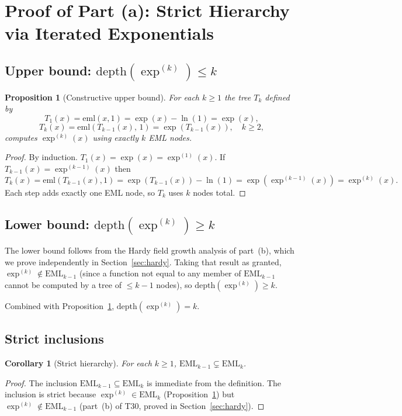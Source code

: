 \documentclass[12pt,a4paper]{article}
\newtheorem{proposition}[theorem]{Proposition}
\newtheorem{corollary}[theorem]{Corollary}
\theoremstyle{definition}
\theoremstyle{remark}
\begin{document}
\section{Proof of Part (a): Strict Hierarchy via Iterated Exponentials}

\subsection{Upper bound: $\mathrm{depth}(\exp^{(k)})\leq k$}

\begin{proposition}[Constructive upper bound]\label{prop:ub}
For each $k\geq 1$ the tree $T_k$ defined by
\[
  T_1(x) = \mathrm{eml}(x,1) = \exp(x)-\ln(1) = \exp(x),
\]
\[
  T_k(x) = \mathrm{eml}(T_{k-1}(x),\,1) = \exp(T_{k-1}(x)),
  \quad k\geq 2,
\]
computes $\exp^{(k)}(x)$ using exactly $k$ EML nodes.
\end{proposition}
\begin{proof}
By induction.  $T_1(x)=\exp(x)=\exp^{(1)}(x)$.  If $T_{k-1}(x)=\exp^{(k-1)}(x)$
then
\[
  T_k(x)=\mathrm{eml}(T_{k-1}(x),1)=\exp(T_{k-1}(x))-\ln(1)
  =\exp(\exp^{(k-1)}(x))=\exp^{(k)}(x).
\]
Each step adds exactly one EML node, so $T_k$ uses $k$ nodes total.
\end{proof}

\subsection{Lower bound: $\mathrm{depth}(\exp^{(k)})\geq k$}

The lower bound follows from the Hardy field growth analysis of part~(b), which
we prove independently in Section~\ref{sec:hardy}.  Taking that result as
granted, $\exp^{(k)}\notin\mathrm{EML}_{k-1}$ (since a function not equal to
any member of $\mathrm{EML}_{k-1}$ cannot be computed by a tree of $\leq k-1$
nodes), so $\mathrm{depth}(\exp^{(k)})\geq k$.

Combined with Proposition~\ref{prop:ub}, $\mathrm{depth}(\exp^{(k)})=k$.

\subsection{Strict inclusions}

\begin{corollary}[Strict hierarchy]\label{cor:strict}
For each $k\geq 1$, $\mathrm{EML}_{k-1}\subsetneq\mathrm{EML}_k$.
\end{corollary}
\begin{proof}
The inclusion $\mathrm{EML}_{k-1}\subseteq\mathrm{EML}_k$ is immediate from the
definition.  The inclusion is strict because $\exp^{(k)}\in\mathrm{EML}_k$
(Proposition~\ref{prop:ub}) but $\exp^{(k)}\notin\mathrm{EML}_{k-1}$
(part~(b) of T30, proved in Section~\ref{sec:hardy}).
\end{proof}
\end{document}
